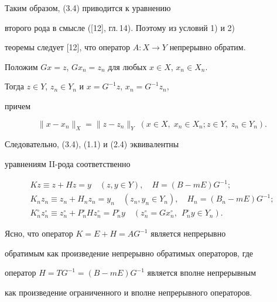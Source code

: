 Таким образом, (3.4) приводится к уравнению


второго рода в смысле ([12], гл.\,14). Поэтому из условий 1) и 2)


теоремы следует [12], что оператор $A:X\to Y$ непрерывно обратим.





Положим $Gx = z$, $Gx_n = z_n$ для любых $x\in X$, $x_n\in X_n$.


Тогда $z\in Y$, $z_n\in Y_n$ и $x = G^{-1}z$, $x_n=G^{-1}z_n$,


причем


\begin{equation}


\|x - x_n\|_X = \|z-z_n\|_Y\; (x\in X,\; x_n\in X_n;z\in Y,\;


z_n\in Y_n).


\end{equation}


Следовательно, (3.4), (1.1) и (2.4) эквивалентны 


уравнениям II-рода соответственно


\begin{gather}


Kz \equiv z + Hz = y\quad (z,y\in Y),\quad H =(B - mE)G^{-1}; \\


%


K_nz_n \equiv z_n + H_nz_n = y_n\quad (z_n,y_n\in Y_n),\quad H_n


=(B_n - mE)G^{-1}; \\


%


K_n^\circ z_n^\circ \equiv z_n^\circ + P_n^\circ H z_n^\circ =


P_n^\circ y\quad (z_n^\circ = Gx_n^\circ ,\ \ P_n^\circ y\in Y_n).


\end{gather}





Ясно, что оператор $K = E+H = AG^{-1}$ является непрерывно


обратимым как произведение непрерывно обратимых операторов, где


оператор $H =TG^{-1} = (B - mE)G^{-1}$ является вполне непрерывным


как произведение ограниченного и вполне непрерывного операторов.





